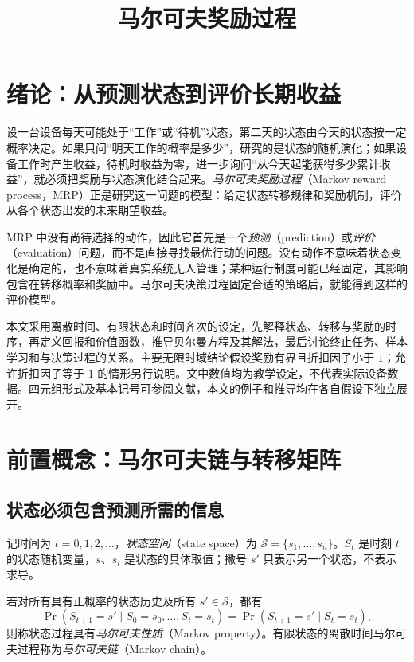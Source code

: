 \documentclass[UTF8,12pt,a4paper,fontset=fandol]{ctexart}
\title{马尔可夫奖励过程}
\author{}
\date{}
\begin{document}
\maketitle
\tableofcontents

\section{绪论：从预测状态到评价长期收益}
\label{sec:mrp-intro}

设一台设备每天可能处于“工作”或“待机”状态，第二天的状态由今天的状态按一定概率决定。如果只问“明天工作的概率是多少”，研究的是状态的随机演化；如果设备工作时产生收益，待机时收益为零，进一步询问“从今天起能获得多少累计收益”，就必须把奖励与状态演化结合起来。\emph{马尔可夫奖励过程}（Markov reward process，MRP）正是研究这一问题的模型：给定状态转移规律和奖励机制，评价从各个状态出发的未来期望收益。

MRP 中没有尚待选择的动作，因此它首先是一个\emph{预测}（prediction）或\emph{评价}（evaluation）问题，而不是直接寻找最优行动的问题。没有动作不意味着状态变化是确定的，也不意味着真实系统无人管理；某种运行制度可能已经固定，其影响包含在转移概率和奖励中。马尔可夫决策过程固定合适的策略后，就能得到这样的评价模型。

本文采用离散时间、有限状态和时间齐次的设定，先解释状态、转移与奖励的时序，再定义回报和价值函数，推导贝尔曼方程及其解法，最后讨论终止任务、样本学习和与决策过程的关系。主要无限时域结论假设奖励有界且折扣因子小于 $1$；允许折扣因子等于 $1$ 的情形另行说明。文中数值均为教学设定，不代表实际设备数据。四元组形式及基本记号可参阅文献\cite{silver-mrp}，本文的例子和推导均在各自假设下独立展开。

\section{前置概念：马尔可夫链与转移矩阵}
\label{sec:mrp-chain}

\subsection{状态必须包含预测所需的信息}

记时间为 $t=0,1,2,\ldots$，\emph{状态空间}（state space）为 $\mathcal S=\{s_1,\ldots,s_n\}$。$S_t$ 是时刻 $t$ 的状态随机变量，$s$、$s_i$ 是状态的具体取值；撇号 $s'$ 只表示另一个状态，不表示求导。

\begin{definition}[马尔可夫性质]
若对所有具有正概率的状态历史及所有 $s'\in\mathcal S$，都有
\begin{equation}
  \Pr(S_{t+1}=s'\mid S_0=s_0,\ldots,S_t=s_t)
  =\Pr(S_{t+1}=s'\mid S_t=s_t),
  \label{eq:mrp-markov}
\end{equation}
则称状态过程具有\emph{马尔可夫性质}（Markov property）。有限状态的离散时间马尔可夫过程称为\emph{马尔可夫链}（Markov chain）。
\end{definition}
\end{document}
